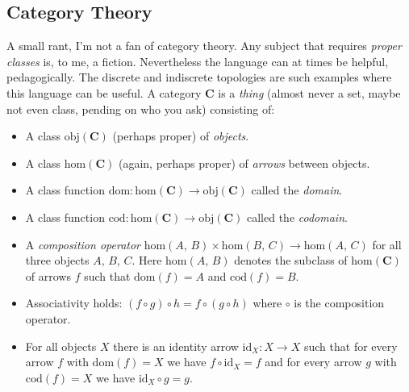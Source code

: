 \documentclass{article}
\theoremstyle{plain}
\theoremstyle{normal}
\begin{document}
        \subsection{Category Theory}
            A small rant, I'm not a fan of category theory. Any subject
            that requires \textit{proper classes} is, to me, a fiction.
            Nevertheless the language can at times be helpful, pedagogically.
            The discrete and indiscrete topologies are such examples where
            this language can be useful. A category $\mathbf{C}$ is a
            \textit{thing} (almost never a set, maybe not even class,
            pending on who you ask) consisting of:%
            \begin{itemize}
                \item A class $\textrm{obj}(\mathbf{C})$
                    (perhaps proper) of \textit{objects}.
                \item A class $\textrm{hom}(\mathbf{C})$
                    (again, perhaps proper)
                    of \textit{arrows} between objects.
                \item A class function
                    $\textrm{dom}:\textrm{hom}(\mathbf{C})\rightarrow\textrm{obj}(\mathbf{C})$
                    called the \textit{domain}.
                \item A class function
                    $\textrm{cod}:\textrm{hom}(\mathbf{C})\rightarrow\textrm{obj}(\mathbf{C})$
                    called the \textit{codomain}.
                \item A \textit{composition operator}
                    $\textrm{hom}(A,\,B)\times\textrm{hom}(B,\,C)\rightarrow\textrm{hom}(A,\,C)$
                    for all three objects $A,\,B,\,C$. Here
                    $\textrm{hom}(A,\,B)$ denotes the subclass of
                    $\textrm{hom}(\mathbf{C})$ of arrows $f$ such that
                    $\textrm{dom}(f)=A$ and $\textrm{cod}(f)=B$.
                \item Associativity holds:
                    $(f\circ{g})\circ{h}=f\circ(g\circ{h})$
                    where $\circ$ is the composition operator.
                \item For all objects $X$ there is an identity arrow
                    $\textrm{id}_{X}:X\rightarrow{X}$ such that for every arrow
                    $f$ with $\textrm{dom}(f)=X$ we have
                    $f\circ\textrm{id}_{X}=f$ and for every arrow
                    $g$ with $\textrm{cod}(f)=X$ we have
                    $\textrm{id}_{X}\circ{g}=g$.
            \end{itemize}
\end{document}
